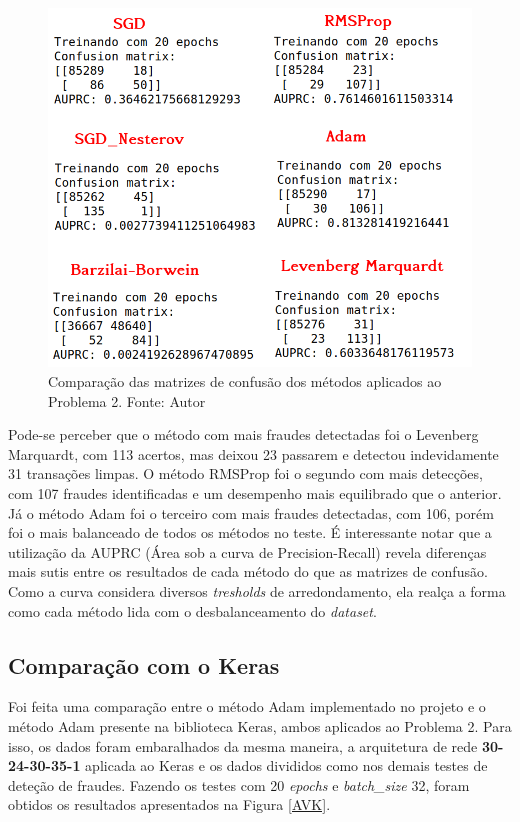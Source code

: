 \documentclass[11pt]{article}
\begin{document}
\begin{figure}[H]
\center
\includegraphics[scale=0.5]{Figuras/CONFMAT.png}
\caption{Comparação das matrizes de confusão dos métodos aplicados ao Problema 2. Fonte: Autor} 
\label{CONFM}
\end{figure}


\noindent
Pode-se perceber que o método com mais fraudes detectadas foi o Levenberg Marquardt, com 113 acertos, mas deixou 23 passarem e detectou indevidamente 31 transações limpas. O método RMSProp foi o segundo com mais detecções, com 107 fraudes identificadas e um desempenho mais equilibrado que o anterior. Já o método Adam foi o terceiro com mais fraudes detectadas, com 106, porém foi o mais balanceado de todos os métodos no teste. É interessante notar que a utilização da AUPRC (Área sob a curva de Precision-Recall) revela diferenças mais sutis entre os resultados de cada método do que as matrizes de confusão. Como a curva considera diversos \textit{tresholds} de arredondamento, ela realça a forma como cada método lida com o desbalanceamento do \textit{dataset}.

\subsection*{Comparação com o Keras}
Foi feita uma comparação entre o método Adam implementado no projeto e o método Adam presente na biblioteca Keras, ambos aplicados ao Problema 2. Para isso, os dados foram embaralhados da mesma maneira, a arquitetura de rede \textbf{30-24-30-35-1} aplicada ao Keras e os dados divididos como nos demais testes de deteção de fraudes. Fazendo os testes com 20 \textit{epochs} e \textit{batch\_size} 32, foram obtidos os resultados apresentados na Figura \ref{AVK}.
\end{document}
